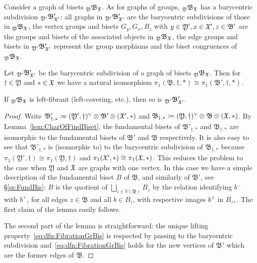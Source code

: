 \documentclass{amsart}
\begin{document}
Consider a graph of bisets ${}_{\mathfrak Y}\mathfrak B_{{\mathfrak X}}$. As for
graphs of groups, ${}_{\mathfrak Y}\mathfrak B_{{\mathfrak X}}$ has a barycentric
subdivision ${}_{\mathfrak Y'}\mathfrak B'_{{\mathfrak X}'}$: all graphs in
${}_{\mathfrak Y'}\mathfrak B'_{{\mathfrak X}'}$ are the barycentric subdivisions of
those in ${}_{\mathfrak Y}\mathfrak B_{{\mathfrak X}}$, the vertex groups and bisets
$G_y,G_x, B_z$ with $y\in \mathfrak Y', x\in {\mathfrak X}', z\in \mathfrak B'$ are
the groups and bisets of the associated objects in ${}_{\mathfrak
  Y}\mathfrak B_{{\mathfrak X}}$, the edge groups and bisets in ${}_{\mathfrak
  Y'}\mathfrak B'_{{\mathfrak X}'}$ represent the group morphisms and the biset
congruences of ${}_{\mathfrak Y}\mathfrak B_{{\mathfrak X}}$.

\begin{lem}\label{lmm:BarSubGrBis}
  Let ${}_{\mathfrak Y'}\mathfrak B'_{{\mathfrak X}'}$ be the barycentric subdivision
  of a graph of bisets ${}_{\mathfrak Y}\mathfrak B_{{\mathfrak X}}$. Then for
  $\dagger\in \mathfrak Y$ and $* \in \mathfrak {{\mathfrak X}}$ we have a natural
  isomorphism $\pi_1(\mathfrak B,\dagger, *)\cong \pi_1(\mathfrak
  B',\dagger, *)$.

  If ${}_{\mathfrak Y}\mathfrak B_{{\mathfrak X}}$ is left-fibrant (left-covering,
  etc.), then so is ${}_{\mathfrak Y'}\mathfrak B'_{{\mathfrak X}'}$.
\end{lem}
\begin{proof}
  Write $\mathfrak B'_{\dagger, *}\coloneqq(\mathfrak
  Y',\dagger)^\vee\otimes\mathfrak B'\otimes({\mathfrak X}',*)$ and $\mathfrak
  B_{\dagger, *}\coloneqq(\mathfrak Y,\dagger)^\vee\otimes\mathfrak
  B\otimes({\mathfrak X},*)$. By Lemma~\ref{lem:CharOfFindBiset}, the fundamental
  bisets of $\mathfrak B'_{\dagger, *}$ and $\mathfrak B_{\dagger, *}$ are
  isomorphic to the fundamental bisets of $\mathfrak B'$ and $\mathfrak B$
  respectively. It is also easy to see that $\mathfrak B'_{\dagger, *}$ is
  (isomorphic to) to the barycentric subdivision of $\mathfrak B_{\dagger,
    *}$ because $\pi_1(\mathfrak Y',\dagger)\cong \pi_1(\mathfrak
  Y,\dagger)$ and $\pi_1({\mathfrak X}',*)\cong \pi_1({\mathfrak X},*)$. This reduces the
  problem to the case when $\mathfrak Y$ and ${\mathfrak X}$ are graphs with one
  vertex. In this case we have a simple description of the fundamental
  biset $B$ of $\mathfrak B$, and similarly of $\mathfrak B'$, see
  \S\ref{ss:FundBis}: $B$ is the quotient of $\bigsqcup_{z\in V(\mathfrak
    B)}B_z$ by the relation identifying $b^-$ with $b^+$, for all edges
  $z\in\mathfrak B$ and all $b\in B_z$, with respective images $b^\pm$ in
  $B_{z^\pm}$. The first claim of the lemma easily follows.

  The second part of the lemma is straightforward: the unique lifting
  property~\eqref{eq:dfn:FibrationGrBis} is respected by passing to the
  barycentric subdivision and~\eqref{eq:dfn:FibrationGrBis} holds for the
  new vertices of $\mathfrak B'$ which are the former edges of $\mathfrak
  B$.
\end{proof}
\end{document}
